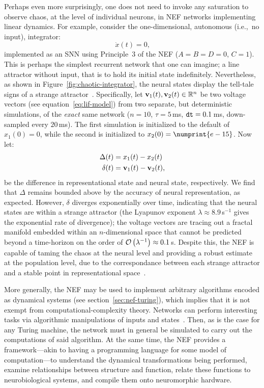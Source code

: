 Perhaps even more surprisingly, one does not need to invoke any saturation to observe chaos, at the level of individual neurons, in NEF networks implementing linear dynamics.
For example, consider the one-dimensional, autonomous (i.e.,~no input), integrator:
$$\dot{x}(t) = 0 \text{,}$$
implemented as an SNN using Principle~3 of the NEF ($A = B = D = 0$, $C = 1$).
This is perhaps the simplest recurrent network that one can imagine; a line attractor without input, that is to hold its initial state indefinitely.
Nevertheless, as shown in Figure~\ref{fig:chaotic-integrator}, the neural states display the tell-tale signs of a strange attractor~\citep[cf.~][Figure~9.3.5]{strogatz2000nonlinear}.
Specifically, let $\mathbf{v}_1(t), \mathbf{v}_2(t) \in \mathbb{R}^n$ be two voltage vectors (see equation~\ref{eq:lif-model}) from two separate, but deterministic simulations, of the \emph{exact} same network ($n = 10$, $\tau = 5$\,ms, $\texttt{dt}{} = 0.1$\,ms, down-sampled every $20$\,ms).
The first simulation is initialized to the default of $x_1(0) = 0$, while the second is initialized to $x_2(0) = \numprint{e-15}$.
Now let:
\begin{align*}
\Delta(t) &= x_1(t) - x_2(t) \\
\delta(t) &= \mathbf{v}_1(t) - \mathbf{v}_2(t) \text{,}
\end{align*}
be the difference in representational state and neural state, respectively.
We find that $\Delta$ remains bounded above by the accuracy of neural representation, as expected.
However, $\delta$ diverges exponentially over time, indicating that the neural states are within a strange attractor (the Lyapunov exponent $\lambda \approx 8.9$\,s${}^{-1}$ gives the exponential rate of divergence); the voltage vectors are tracing out a fractal manifold embedded within an $n$-dimensional space that cannot be predicted beyond a time-horizon on the order of $\mathcal{O}\left({\lambda^{-1}}\right) \approx 0.1$\,s.
Despite this, the NEF is capable of taming the chaos at the neural level and providing a robust estimate at the population level, due to the correspondance between each strange attractor and a stable point in representational space~\citep[][p.~237]{eliasmith2003a}.

More generally, the NEF may be used to implement arbitrary algorithms encoded as dynamical systems (see section~\ref{sec:nef-turing}), which implies that it is not exempt from computational-complexity theory. 
Networks can perform interesting tasks via algorithmic manipulations of inputs and states~\citep{choo2018}.
Then, as is the case for any Turing machine, the network must in general be simulated to carry out the computations of said algorithm.
At the same time, the NEF provides a framework---akin to having a programming language for some model of computation---to understand the dynamical transformations being performed, examine relationships between structure and function, relate these functions to neurobiological systems, and compile them onto neuromorphic hardware.

